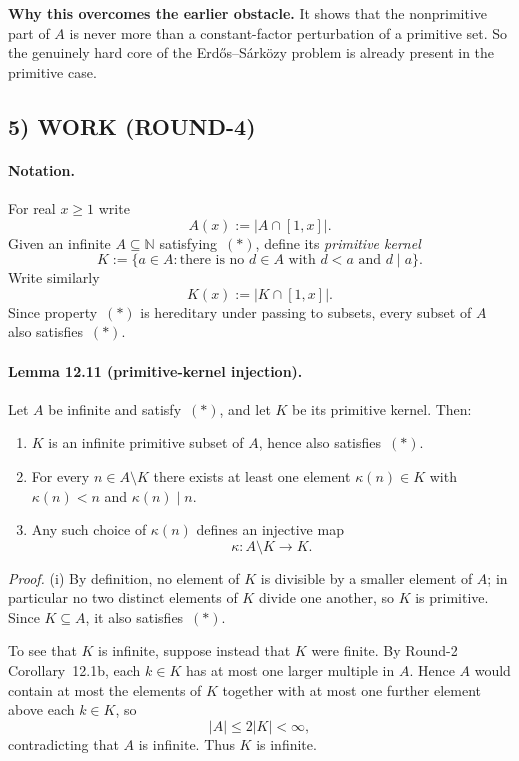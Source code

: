 \textbf{Why this overcomes the earlier obstacle.}
It shows that the nonprimitive part of $A$ is never more than a constant-factor perturbation of a primitive set. So the genuinely hard core of the Erd\H{o}s--S\'ark\"ozy problem is already present in the primitive case.

\subsection*{5) WORK (ROUND-4)}

\paragraph{\textbf{Notation.}}
For real $x\ge 1$ write
\[
A(x):=|A\cap[1,x]|.
\]
Given an infinite $A\subseteq\mathbb N$ satisfying~$(*)$, define its \emph{primitive kernel}
\[
K:=\{a\in A:\text{there is no }d\in A\text{ with }d<a\text{ and }d\mid a\}.
\]
Write similarly
\[
K(x):=|K\cap[1,x]|.
\]
Since property~$(*)$ is hereditary under passing to subsets, every subset of $A$ also satisfies~$(*)$.

\bigskip

\paragraph{\textbf{Lemma 12.11 (primitive-kernel injection).}}
Let $A$ be infinite and satisfy~$(*)$, and let $K$ be its primitive kernel.
Then:
\begin{enumerate}
\item[(i)] $K$ is an infinite primitive subset of $A$, hence also satisfies~$(*)$.
\item[(ii)] For every $n\in A\setminus K$ there exists at least one element $\kappa(n)\in K$ with $\kappa(n)<n$ and $\kappa(n)\mid n$.
\item[(iii)] Any such choice of $\kappa(n)$ defines an injective map
\[
\kappa:A\setminus K\longrightarrow K.
\]
\end{enumerate}

\emph{Proof.}
(i) By definition, no element of $K$ is divisible by a smaller element of $A$; in particular no two distinct elements of $K$ divide one another, so $K$ is primitive.
Since $K\subseteq A$, it also satisfies~$(*)$.

To see that $K$ is infinite, suppose instead that $K$ were finite.
By Round-2 Corollary~12.1b, each $k\in K$ has at most one larger multiple in $A$.
Hence $A$ would contain at most the elements of $K$ together with at most one further element above each $k\in K$, so
\[
|A|\le 2|K|<\infty,
\]
contradicting that $A$ is infinite.
Thus $K$ is infinite.

